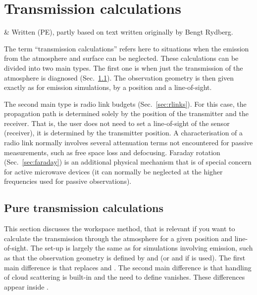 \chapter{Transmission calculations}
 \label{sec:trans}

 & Written (PE), partly based on text written originally by 
          Bengt Rydberg.
\stophistory

\graphicspath{{Figs/transmission/}}

The term ``transmission calculations'' refers here to situations when the
emission from the atmosphere and surface can be neglected. These
calculations can be divided into two main types. The first one is when just the
transmission of the atmosphere is diagnosed (Sec.~\ref{sec:transmission}). The
observation geometry is then given exactly as for emission simulations, by a
position and a line-of-sight.

The second main type is radio link budgets (Sec.~\ref{sec:rlinks}). For this
case, the propagation path is determined solely by the position of the
transmitter and the receiver. That is, the user does not need to set a
line-of-sight of the sensor (receiver), it is determined by the transmitter
position. A characterisation of a radio link normally involves several
attenuation terms not encountered for passive measurements, such as free space
loss and defocusing. Faraday rotation (Sec.~\ref{sec:faraday}) is an additional
physical mechanism that is of special concern for active microwave devices (it
can normally be neglected at the higher frequencies used for passive
observations).




\section{Pure transmission calculations}
\label{sec:transmission}

This section discusses the  workspace method,
that is relevant if you want to calculate the transmission through the
atmosphere for a given position and line-of-sight. The set-up is largely the
same as for simulations involving emission, such as that the observation
geometry is defined by  and  (or
 and  if  is used).
The first main difference is that  replaces
 and . The second
main difference is that handling of cloud scattering is built-in and the need
to define  vanishes. These differences appear
inside .

